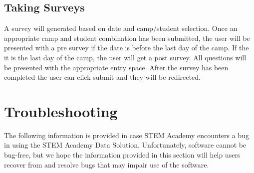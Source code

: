 \documentclass[letterpaper,10pt,serif, draftclsnofoot,onecolumn, compsoc, titlepage]{IEEEtran}
\begin{document}
\subsection{Taking Surveys}
A survey will generated based on date and camp/student selection. Once an appropriate camp and student combination 
has been submitted, the user will be presented with a pre survey if the date is before the last day of the camp. If 
the it is the last day of the camp, the user will get a post survey. All questions will be presented with the 
appropriate entry space. After the survey has been completed the user can click submit and they will be redirected.

\section{Troubleshooting}
The following information is provided in case STEM Academy encounters a bug in using the STEM Academy Data Solution.
Unfortunately, software cannot be bug-free, but we hope the information provided in this section will help users recover
 from and resolve bugs that may impair use of the software.
\end{document}
